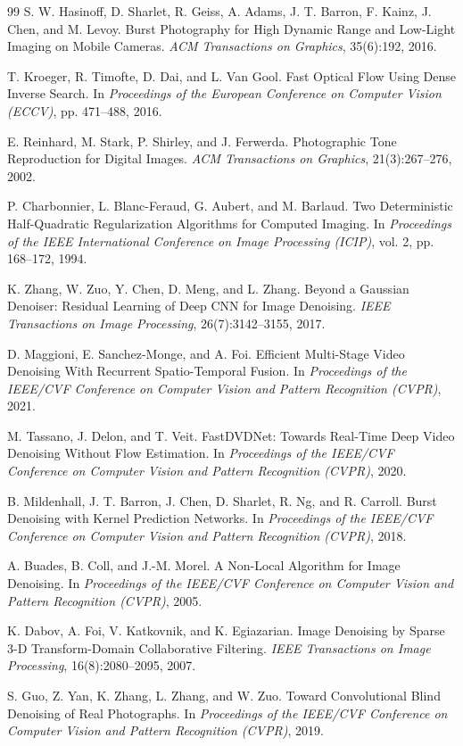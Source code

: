 \documentclass[11pt,a4paper,UTF8,fontset=fandol]{ctexart}
\begin{document}
\begin{thebibliography}{99}
 S. W. Hasinoff, D. Sharlet, R. Geiss, A. Adams, J. T. Barron, F. Kainz, J. Chen, and M. Levoy. Burst Photography for High Dynamic Range and Low-Light Imaging on Mobile Cameras. \emph{ACM Transactions on Graphics}, 35(6):192, 2016.

 T. Kroeger, R. Timofte, D. Dai, and L. Van Gool. Fast Optical Flow Using Dense Inverse Search. In \emph{Proceedings of the European Conference on Computer Vision (ECCV)}, pp. 471--488, 2016.

 E. Reinhard, M. Stark, P. Shirley, and J. Ferwerda. Photographic Tone Reproduction for Digital Images. \emph{ACM Transactions on Graphics}, 21(3):267--276, 2002.

 P. Charbonnier, L. Blanc-Feraud, G. Aubert, and M. Barlaud. Two Deterministic Half-Quadratic Regularization Algorithms for Computed Imaging. In \emph{Proceedings of the IEEE International Conference on Image Processing (ICIP)}, vol. 2, pp. 168--172, 1994.

 K. Zhang, W. Zuo, Y. Chen, D. Meng, and L. Zhang. Beyond a Gaussian Denoiser: Residual Learning of Deep CNN for Image Denoising. \emph{IEEE Transactions on Image Processing}, 26(7):3142--3155, 2017.

 D. Maggioni, E. Sanchez-Monge, and A. Foi. Efficient Multi-Stage Video Denoising With Recurrent Spatio-Temporal Fusion. In \emph{Proceedings of the IEEE/CVF Conference on Computer Vision and Pattern Recognition (CVPR)}, 2021.

 M. Tassano, J. Delon, and T. Veit. FastDVDNet: Towards Real-Time Deep Video Denoising Without Flow Estimation. In \emph{Proceedings of the IEEE/CVF Conference on Computer Vision and Pattern Recognition (CVPR)}, 2020.

 B. Mildenhall, J. T. Barron, J. Chen, D. Sharlet, R. Ng, and R. Carroll. Burst Denoising with Kernel Prediction Networks. In \emph{Proceedings of the IEEE/CVF Conference on Computer Vision and Pattern Recognition (CVPR)}, 2018.

 A. Buades, B. Coll, and J.-M. Morel. A Non-Local Algorithm for Image Denoising. In \emph{Proceedings of the IEEE/CVF Conference on Computer Vision and Pattern Recognition (CVPR)}, 2005.

 K. Dabov, A. Foi, V. Katkovnik, and K. Egiazarian. Image Denoising by Sparse 3-D Transform-Domain Collaborative Filtering. \emph{IEEE Transactions on Image Processing}, 16(8):2080--2095, 2007.

 S. Guo, Z. Yan, K. Zhang, L. Zhang, and W. Zuo. Toward Convolutional Blind Denoising of Real Photographs. In \emph{Proceedings of the IEEE/CVF Conference on Computer Vision and Pattern Recognition (CVPR)}, 2019.

\end{thebibliography}
\end{document}
